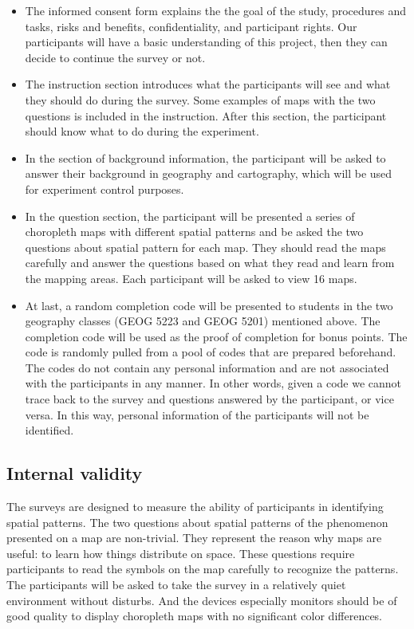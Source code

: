 \begin{itemize}
    \item The informed consent form explains the the goal of the study, procedures and tasks, risks and benefits, confidentiality, and participant rights. Our participants will have a basic understanding of this project, then they can decide to continue the survey or not. 
    
    \item The instruction section introduces what the participants will see and what they should do during the survey. Some examples of maps with the two questions is included in the instruction. After this section, the participant should know what to do during the experiment. 

    \item In the section of background information, the participant will be asked to answer their background in geography and cartography, which will be used for experiment control purposes. 

    \item In the question section, the participant will be presented a series of choropleth maps with different spatial patterns and be asked the two questions about spatial pattern for each map. They should read the maps carefully and answer the questions based on what they read and learn from the mapping areas. Each participant will be asked to view 16 maps.

    \item At last, a random completion code will be presented to students in the two geography classes (GEOG 5223 and GEOG 5201) mentioned above. The completion code will be used as the proof of completion for bonus points. The code is randomly pulled from a pool of codes that are prepared beforehand. The codes do not contain any personal information and are not associated with the participants in any manner. In other words, given a code we cannot trace back to the survey and questions answered by the participant, or vice versa. In this way, personal information of the participants will not be identified.
\end{itemize}

\subsection{Internal validity}

The surveys are designed to measure the ability of participants in identifying spatial patterns. The two questions about spatial patterns of the phenomenon presented on a map are non-trivial. They represent the reason why maps are useful: to learn how things distribute on space. These questions require participants to read the symbols on the map carefully to recognize the patterns. The participants will be asked to take the survey in a relatively quiet environment without disturbs. And the devices especially monitors should be of good quality to display choropleth maps with no significant color differences. 


